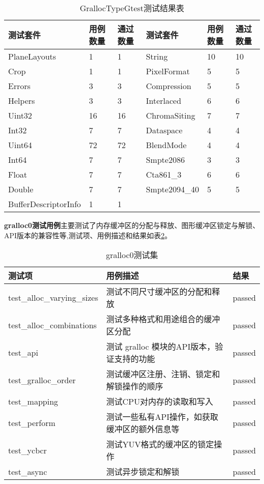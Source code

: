 \begin{table}[h]
    \centering
    \caption{GrallocTypeGtest测试结果表}
    \label{tab:GrallocTypeGtest测试结果表}
    \begin{tabular}{llllll}
      \toprule
      测试套件 & 用例数量 &通过数量 & 测试套件 & 用例数量 &通过数量\\
      \midrule
      PlaneLayouts & 1 & 1 & String & 10 & 10 \\
      Crop & 1 & 1 & PixelFormat & 5 & 5 \\
      Errors & 3 & 3 & Compression & 5 & 5 \\
      Helpers & 3 & 3 & Interlaced & 6 & 6 \\
      Uint32 & 16 & 16 & ChromaSiting & 7 & 7 \\
      Int32 & 7 & 7 & Dataspace & 4 & 4 \\
      Uint64 & 72 & 72 & BlendMode & 4 & 4 \\
      Int64 & 7 & 7 & Smpte2086 & 3 & 3 \\
      Float & 7 & 7 & Cta861\_3 & 6 & 6 \\
      Double & 7 & 7 & Smpte2094\_40 & 5 & 5 \\
      BufferDescriptorInfo & 1 & 1 \\
      \bottomrule
    \end{tabular}
    \note{}
\end{table}


\textbf{gralloc0测试用例}主要测试了内存缓冲区的分配与释放、图形缓冲区锁定与解锁、API版本的兼容性等,测试项、用例描述和结果如表\ref{tab:gralloc0测试集}。

\begin{table}[h]
    \centering
    \caption{gralloc0测试集}
    \label{tab:gralloc0测试集}
    \begin{tabular}{lll}
      \toprule
      测试项 & 用例描述 & 结果 \\
      \midrule
      test\_alloc\_varying\_sizes & 测试不同尺寸缓冲区的分配和释放 & passed\\
      test\_alloc\_combinations & 测试多种格式和用途组合的缓冲区分配 & passed\\
      test\_api & 测试 gralloc 模块的API版本，验证支持的功能 & passed\\
      test\_gralloc\_order & 测试缓冲区注册、注销、锁定和解锁操作的顺序 & passed\\
      test\_mapping & 测试CPU对内存的读取和写入 & passed\\
      test\_perform & 测试一些私有API操作，如获取缓冲区的额外信息等 & passed\\
      test\_ycbcr & 测试YUV格式的缓冲区的锁定操作 & passed\\
      test\_async & 测试异步锁定和解锁 & passed\\
      \bottomrule
    \end{tabular}
    \note{}
\end{table}

